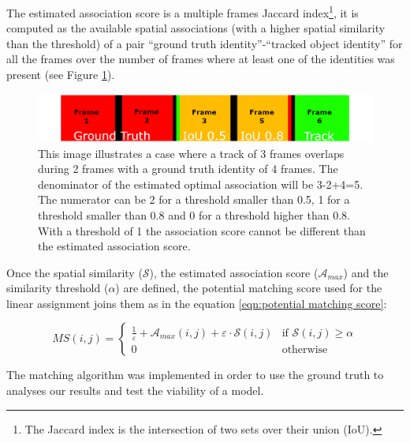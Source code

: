 {
    The estimated association score is a multiple frames Jaccard index\footnote{The Jaccard index is the intersection of two sets over their union (\ac{IoU}).}, it is computed as the available spatial associations (with a higher spatial similarity than the threshold) of a pair ``ground truth identity''-``tracked object identity'' for all the frames over the number of frames where at least one of the identities was present (see Figure \ref{fig:hota_preassociation}).
}

\begin{figure}[!h]
    \centering
    \includegraphics[width=\linewidth]{figures/05_methodology/HOTA_association_example.png}
    \caption[HOTA: Track overlap with ground truth]{\footnotesize{
        This image illustrates a case where a track of 3 frames overlaps during 2 frames with a ground truth identity of 4 frames. 
        The denominator of the estimated optimal association will be 3-2+4=5. 
        The numerator can be 2 for a threshold smaller than 0.5, 1 for a threshold smaller than 0.8 and 0 for a threshold higher than 0.8. 
        With a threshold of 1 the association score cannot be different than the estimated association score.
        }}
    \label{fig:hota_preassociation}
\end{figure}

{
    Once the spatial similarity ($\mathcal{S}$), the estimated association score ($\mathcal{A}_{max}$) and the similarity threshold ($\alpha$) are defined, the potential matching score used for the linear assignment joins them as in the equation \ref{eqn:potential matching score}:
}

\begin{equation}
    \label{eqn:potential matching score}
    MS(i, j) = \begin{cases}
        \frac{1}{\varepsilon} + \mathcal{A}_{max}(i, j) + \varepsilon \cdot \mathcal{S}(i, j) & \text{if } \mathcal{S}(i, j) \geq \alpha\\
        0 & \text{otherwise}
    \end{cases}
\end{equation}
    
{
    The matching algorithm was implemented in order to use the ground truth to analyses our results and test the viability of a model.
}

